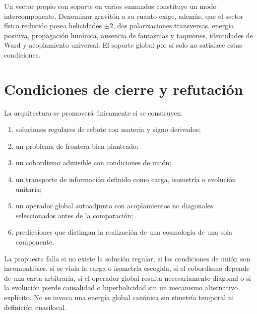 Un vector propio con soporte en varios sumandos constituye un modo
intercomponente. Denominar gravitón a su cuanto exige, además, que el sector
físico reducido posea helicidades \(\pm2\), dos polarizaciones transversas,
energía positiva, propagación lumínica, ausencia de fantasmas y taquiones,
identidades de Ward y acoplamiento universal. El soporte global por sí solo
no satisface estas condiciones.

\section{Condiciones de cierre y refutación}
\label{sec:condiciones-prueba-cosmologia-hmt}

La arquitectura se promoverá únicamente si se construyen:
\begin{enumerate}
 \item soluciones regulares de rebote con materia y signo derivados;
 \item un problema de frontera bien planteado;
 \item un cobordismo admisible con condiciones de unión;
 \item un transporte de información definido como carga, isometría o
 evolución unitaria;
 \item un operador global autoadjunto con acoplamientos no diagonales
 seleccionados antes de la comparación;
 \item predicciones que distingan la realización de una cosmología de una
 sola componente.
\end{enumerate}

La propuesta falla si no existe la solución regular, si las condiciones de
unión son incompatibles, si se viola la carga o isometría escogida, si el
cobordismo depende de una carta arbitraria, si el operador global resulta
necesariamente diagonal o si la evolución pierde causalidad o
hiperbolicidad sin un mecanismo alternativo explícito. No se invoca una
energía global canónica sin simetría temporal ni definición cuasilocal.
